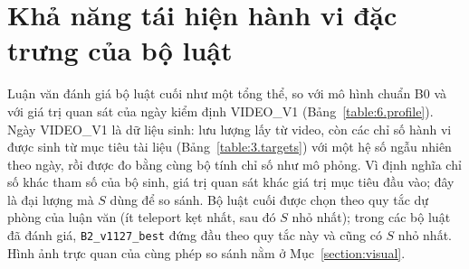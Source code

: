 \documentclass[../main.tex]{subfiles}
\begin{document}
\section{Khả năng tái hiện hành vi đặc trưng của bộ luật}
\label{section:ruleset_profile}

Luận văn đánh giá bộ luật cuối như một tổng thể, so với mô hình chuẩn B0 và với giá trị quan sát của ngày kiểm định VIDEO\_V1 (Bảng~\ref{table:6.profile}). Ngày VIDEO\_V1 là dữ liệu sinh: lưu lượng lấy từ video, còn các chỉ số hành vi được sinh từ mục tiêu tài liệu (Bảng~\ref{table:3.targets}) với một hệ số ngẫu nhiên theo ngày, rồi được đo bằng cùng bộ tính chỉ số như mô phỏng. Vì định nghĩa chỉ số khác tham số của bộ sinh, giá trị quan sát khác giá trị mục tiêu đầu vào; đây là đại lượng mà $S$ dùng để so sánh. Bộ luật cuối được chọn theo quy tắc dự phòng của luận văn (ít teleport kẹt nhất, sau đó $S$ nhỏ nhất); trong các bộ luật đã đánh giá, \texttt{B2\_v1127\_best} đứng đầu theo quy tắc này và cũng có $S$ nhỏ nhất. Hình ảnh trực quan của cùng phép so sánh nằm ở Mục~\ref{section:visual}.
\end{document}
